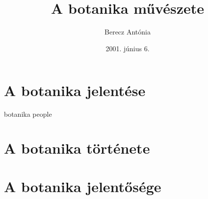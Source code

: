 \documentclass{book}
\title{A botanika művészete}
\author{Berecz Antónia}
\date{2001. június 6.}
\begin{document}
\frontmatter
\indexprologue

\tableofcontents
\mainmatter
\chapter{A botanika jelentése}
\hulipsum
\index botanika
\index people
\chapter{A botanika története}
\hulipsum
\chapter{A botanika jelentősége}
\hulipsum
{}
\backmatter
\end{document}
